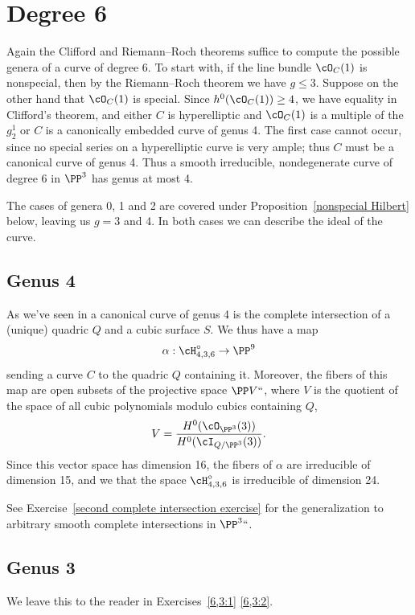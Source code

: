 \section{Degree 6}

Again the Clifford and Riemann--Roch theorems suffice to compute the
possible genera of a curve of degree 6. To start with,  if the line bundle
$\cO_C(1)$ is nonspecial, then by the Riemann--Roch theorem we have $g
\leq 3$. Suppose on the other hand that $\cO_C(1)$ is special. Since
$h^{0}(\cO_C(1)) \geq 4$, we have equality in Clifford's theorem,
and either $C$ is hyperelliptic and $\cO_C(1)$ is a multiple of the
$g^{1}_{2}$ or  $C$ is  a canonically embedded curve of genus 4. The
first case cannot occur, since no special series on a hyperelliptic
curve is very ample; thus $C$ must be a canonical curve of genus 4. Thus
a smooth irreducible, nondegenerate curve of degree 6 in $\PP^3$ has
genus at most 4.

The cases of genera 0, 1 and 2 are covered under
Proposition~\ref{nonspecial Hilbert} below, leaving us 
$g =
3$ and 4. In both cases we can describe the ideal of the curve.

\subsection*{Genus 4}

As we've seen in
a canonical curve of genus 4 is the complete intersection of a (unique)
quadric $Q$ and a cubic surface $S$. We thus have a map
$$
\alpha : \cH^\circ_{4,3,6} \to \PP^9
$$
sending a curve $C$ to the quadric $Q$ containing it. Moreover, the
fibers of this map are open subsets of the projective space $\PP V` `$,
where $V$ is the quotient of the space of all cubic polynomials modulo
cubics containing $Q$,
$$
V = \frac{H^0(\cO_{\PP^3}(3))}{H^0(\cI_{Q/\PP^3}(3))}.
$$
Since this vector space has dimension 16, the fibers of $\alpha$
are irreducible of dimension 15, and we 
that the space
$\cH^\circ_{4,3,6}$ is irreducible of dimension 24.

See Exercise~\ref{second complete intersection exercise} for the
generalization to arbitrary smooth complete intersections in $\PP^3` `$.

\subsection*{Genus 3}
We leave this to the reader in Exercises~\ref{6,3:1}
\ref{6,3:2}.


